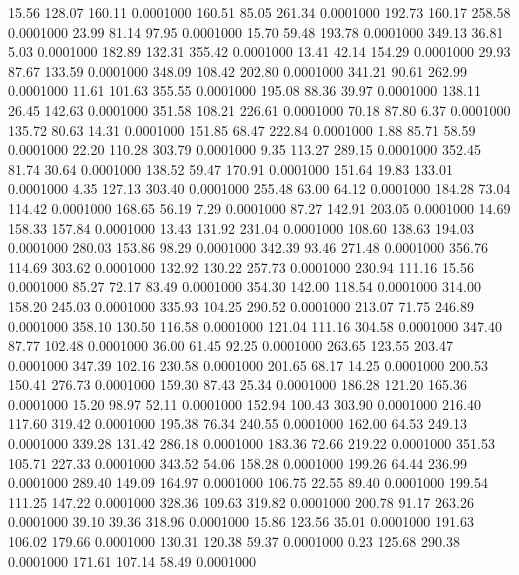   15.56  128.07  160.11   0.0001000
 160.51   85.05  261.34   0.0001000
 192.73  160.17  258.58   0.0001000
  23.99   81.14   97.95   0.0001000
  15.70   59.48  193.78   0.0001000
 349.13   36.81    5.03   0.0001000
 182.89  132.31  355.42   0.0001000
  13.41   42.14  154.29   0.0001000
  29.93   87.67  133.59   0.0001000
 348.09  108.42  202.80   0.0001000
 341.21   90.61  262.99   0.0001000
  11.61  101.63  355.55   0.0001000
 195.08   88.36   39.97   0.0001000
 138.11   26.45  142.63   0.0001000
 351.58  108.21  226.61   0.0001000
  70.18   87.80    6.37   0.0001000
 135.72   80.63   14.31   0.0001000
 151.85   68.47  222.84   0.0001000
   1.88   85.71   58.59   0.0001000
  22.20  110.28  303.79   0.0001000
   9.35  113.27  289.15   0.0001000
 352.45   81.74   30.64   0.0001000
 138.52   59.47  170.91   0.0001000
 151.64   19.83  133.01   0.0001000
   4.35  127.13  303.40   0.0001000
 255.48   63.00   64.12   0.0001000
 184.28   73.04  114.42   0.0001000
 168.65   56.19    7.29   0.0001000
  87.27  142.91  203.05   0.0001000
  14.69  158.33  157.84   0.0001000
  13.43  131.92  231.04   0.0001000
 108.60  138.63  194.03   0.0001000
 280.03  153.86   98.29   0.0001000
 342.39   93.46  271.48   0.0001000
 356.76  114.69  303.62   0.0001000
 132.92  130.22  257.73   0.0001000
 230.94  111.16   15.56   0.0001000
  85.27   72.17   83.49   0.0001000
 354.30  142.00  118.54   0.0001000
 314.00  158.20  245.03   0.0001000
 335.93  104.25  290.52   0.0001000
 213.07   71.75  246.89   0.0001000
 358.10  130.50  116.58   0.0001000
 121.04  111.16  304.58   0.0001000
 347.40   87.77  102.48   0.0001000
  36.00   61.45   92.25   0.0001000
 263.65  123.55  203.47   0.0001000
 347.39  102.16  230.58   0.0001000
 201.65   68.17   14.25   0.0001000
 200.53  150.41  276.73   0.0001000
 159.30   87.43   25.34   0.0001000
 186.28  121.20  165.36   0.0001000
  15.20   98.97   52.11   0.0001000
 152.94  100.43  303.90   0.0001000
 216.40  117.60  319.42   0.0001000
 195.38   76.34  240.55   0.0001000
 162.00   64.53  249.13   0.0001000
 339.28  131.42  286.18   0.0001000
 183.36   72.66  219.22   0.0001000
 351.53  105.71  227.33   0.0001000
 343.52   54.06  158.28   0.0001000
 199.26   64.44  236.99   0.0001000
 289.40  149.09  164.97   0.0001000
 106.75   22.55   89.40   0.0001000
 199.54  111.25  147.22   0.0001000
 328.36  109.63  319.82   0.0001000
 200.78   91.17  263.26   0.0001000
  39.10   39.36  318.96   0.0001000
  15.86  123.56   35.01   0.0001000
 191.63  106.02  179.66   0.0001000
 130.31  120.38   59.37   0.0001000
   0.23  125.68  290.38   0.0001000
 171.61  107.14   58.49   0.0001000
